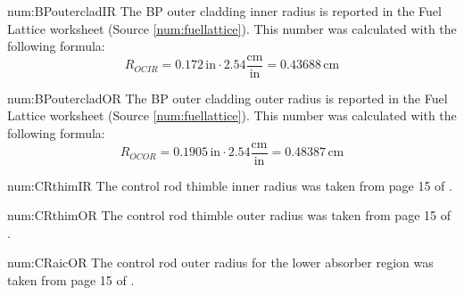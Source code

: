 \begin{numitem}{num:BPoutercladIR}
  The \ac{BP} outer cladding inner radius is reported in the Fuel Lattice worksheet (Source \ref{num:fuellattice}). This number was calculated with the following formula:
  \[
      R_{OCIR} = 0.172\,\mathrm{in}\cdot 2.54 \mathrm{\frac{cm}{in}} = 0.43688\,\mathrm{cm}
  \]
  
\end{numitem}

\begin{numitem}{num:BPoutercladOR}
  The \ac{BP} outer cladding outer radius is reported in the Fuel Lattice worksheet (Source \ref{num:fuellattice}). This number was calculated with the following formula:
  \[
      R_{OCOR} = 0.1905\,\mathrm{in}\cdot 2.54 \mathrm{\frac{cm}{in}} = 0.48387\,\mathrm{cm}
  \]
  
\end{numitem}

\begin{numitem}{num:CRthimIR}
  The control rod thimble inner radius was taken from page 15 of
  \cite{ml033530020}.
  
\end{numitem}

\begin{numitem}{num:CRthimOR}
  The control rod thimble outer radius was taken from page 15 of
  \cite{ml033530020}.
  
\end{numitem}

\begin{numitem}{num:CRaicOR}
  The control rod outer radius for the lower absorber region was taken from page
  15 of \cite{ml033530020}.
  
\end{numitem}


